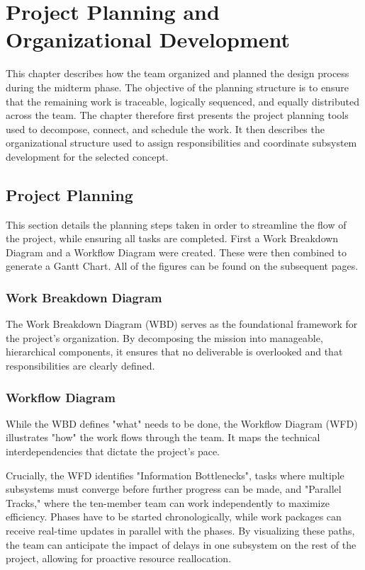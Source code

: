 \chapter{Project Planning and Organizational Development}

This chapter describes how the team organized and planned the design process during the midterm phase. The objective of the planning structure is to ensure that the remaining work is traceable, logically sequenced, and equally distributed across the team. The chapter therefore first presents the project planning tools used to decompose, connect, and schedule the work. It then describes the organizational structure used to assign responsibilities and coordinate subsystem development for the selected concept.

\section{Project Planning}
This section details the planning steps taken in order to streamline the flow of the project, while ensuring all tasks are completed. First a Work Breakdown Diagram and a Workflow Diagram were created. These were then combined to generate a Gantt Chart. All of the figures can be found on the subsequent pages.

\subsection{Work Breakdown Diagram}
The Work Breakdown Diagram (WBD) serves as the foundational framework for the project's organization. By decomposing the mission into manageable, hierarchical components, it ensures that no deliverable is overlooked and that responsibilities are clearly defined. 

\subsection{Workflow Diagram}
While the WBD defines "what" needs to be done, the Workflow Diagram (WFD) illustrates "how" the work flows through the team. It maps the technical interdependencies that dictate the project’s pace. 

Crucially, the WFD identifies "Information Bottlenecks", tasks where multiple subsystems must converge before further progress can be made, and "Parallel Tracks," where the ten-member team can work independently to maximize efficiency. Phases have to be started chronologically, while work packages can receive real-time updates in parallel with the phases. By visualizing these paths, the team can anticipate the impact of delays in one subsystem on the rest of the project, allowing for proactive resource reallocation.

